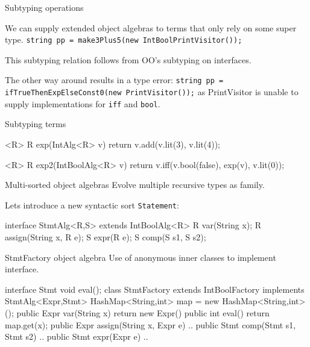 \documentclass[10pt, compress]{beamer}
\newcommand{\inlinecode}[2]{\colorbox{backg}{\scriptsize{\texttt{#2}}}}
\newenvironment{slide}[1]{\begin{frame}[fragile,environment=slide]{#1}}{\end{frame}}
\newenvironment{slide}[2]{\begin{frame}[fragile,environment=slide]{#1}{#2}}{\end{frame}}
\begin{document}
\begin{slide}{Subtyping operations}

We can supply extended object algebras to terms that only rely on some super type.
\inlinecode{java}{string pp = make3Plus5(new IntBoolPrintVisitor());}

This subtyping relation follows from OO's subtyping on interfaces.

The other way around results in a type error:
\inlinecode{java}{string pp = ifTrueThenExpElseConst0(new PrintVisitor());} %
as PrintVisitor is unable to supply implementations for \inlinecode{java}{iff} and \inlinecode{java}{bool}.
\end{slide}

\begin{slide}{Subtyping terms}

\begin{java}
<R> R exp(IntAlg<R> v) {
  return v.add(v.lit(3), v.lit(4));
}
\end{java}
\begin{java}
<R> R exp2(IntBoolAlg<R> v) {
  return v.iff(v.bool(false), exp(v), v.lit(0));
}
\end{java}

\end{slide}


\begin{slide}{Multi-sorted object algebras}
Evolve multiple recursive types as family.

Lets introduce a new syntactic sort \inlinecode{java}{Statement}:
\begin{java}
interface StmtAlg<R,S> extends IntBoolAlg<R> {
  R var(String x);
  R assign(String x, R e);
  S expr(R e);
  S comp(S s1, S s2);
}
\end{java}
\end{slide}

\begin{slide}{StmtFactory object algebra}
Use of anonymous inner classes to implement interface. %
\begin{java}
interface Stmt {
  void eval();
}
class StmtFactory extends IntBoolFactory
                  implements StmtAlg<Expr,Stmt> {
  HashMap<String,int> map = new HashMap<String,int>();
  public Expr var(String x) {
    return new Expr() {
      public int eval() {
        return map.get(x);
      }
    }
  }
  public Expr assign(String x, Expr e) { .. }
  public Stmt comp(Stmt s1, Stmt s2) { .. }
  public Stmt expr(Expr e) { .. }
}
\end{java}
\end{slide}
\end{document}
